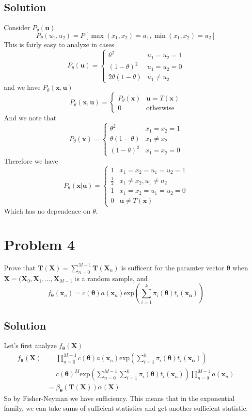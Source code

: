 \documentclass[a4paper]{article}
\begin{document}
\subsection*{Solution}%
Consider $P_{\theta}(\bm{u})$
\[
  P_{\theta}(u_1, u_2) = P[\max(x_1,x_2) = u_1, \min(x_1,x_2) = u_2]
\]
This is fairly easy to analyze in cases
\[
  P_{\theta}(\bm{u}) = 
  \begin{cases}
    \theta^2 & u_1=u_2=1 \\
    (1 - \theta)^2 & u_1=u_2=0 \\
    2\theta(1 - \theta) & u_1 \neq u_2
  \end{cases}
\]
and we have $P_{\theta}(\bm{x}, \bm{u})$
\[
  P_{\theta}(\bm{x}, \bm{u}) = 
  \begin{cases}
    P_{\theta}(\bm{x}) & \bm{u} = T(\bm{x}) \\
    0 & \text{otherwise}
  \end{cases}
\]
And we note that
\[
  P_{\theta}(\bm{x}) = 
  \begin{cases}
    \theta^2 & x_1 = x_2 = 1 \\
    \theta(1 - \theta) & x_1 \neq x_2 \\
    (1 - \theta)^2 & x_1 = x_2 = 0
  \end{cases}
\]
Therefore we have
\[
  P_{\theta}(\bm{x}|\bm{u}) = 
  \begin{cases}
    1 & x_1 = x_2 = u_1 = u_2 = 1 \\
    \frac{1}{2} & x_1 \neq x_2, u_1 \neq u_2 \\
    1 & x_1 = x_2 = u_1 = u_2 = 0 \\
    0 & \bm{u} \neq T(\bm{x})
  \end{cases}
\]
Which has no dependence on $\theta$.

\section*{Problem 4}%
Prove that $\bm{T}(\bm{X}) = \sum_{n=0}^{M-1} \bm{T}(\bm{X}_n)$  is sufficent for the paramter vector $\bm{\theta}$ when $\bm{X} = (\bm{X}_0, \bm{X}_1, \dots, \bm{X}_{M-1}$ is a random sample, and 
\[
  f_{\bm{\theta}}(\bm{x}_n) = c(\bm{\theta})a(\bm{x}_n) \text{exp} \left( \sum_{i=1}^k \pi_i(\bm{\theta})t_i(\bm{x_n}) \right)
\]

\subsection*{Solution}%
Let's first analyze $f_{\bm{\theta}}(\bm{X})$
\[
  \begin{aligned}
    f_{\bm{\theta}}(\bm{X}) &=  \prod_{n=0}^{M-1} c(\bm{\theta})a(\bm{x}_n)\text{exp} \left( \sum_{i=1}^k \pi_i(\bm{\theta})t_i(\bm{x_n}) \right) \\
                            &= c(\bm{\theta})^M \text{exp} \left( \sum_{n=0}^{M-1} \sum_{i=1}^k \pi_i(\bm{\theta}) t_i(\bm{x}_n) \right) \prod_{n=0}^{M-1} a(\bm{x}_n) \\
                            &= \beta_{\bm{\theta}}(\bm{T}(\bm{X})) \alpha(\bm{X})
  \end{aligned}
\]
So by Fisher-Neyman we have sufficiency. This means that in the exponential family, we can take sums of sufficient statistics and get another sufficient statistic.
\end{document}
